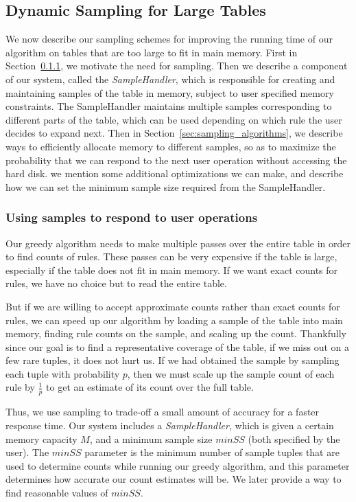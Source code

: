 

\subsection{Dynamic Sampling for Large Tables}\label{sec:sampling}
We now describe our sampling schemes for improving the running time of our algorithm on tables that are too large to fit in main memory. First in Section~\ref{sec:sample-using}, we motivate the need for sampling. Then we describe a component of our system, called the {\em SampleHandler}, which is responsible for creating and maintaining samples of the table in memory, subject to user specified memory constraints. The SampleHandler maintains multiple samples corresponding to different parts of the table, which can be used depending on which rule the user decides to expand next. Then in Section~\ref{sec:sampling_algorithms}, we describe ways to efficiently allocate memory to different samples, so as to maximize the probability that we can respond to the next user operation without accessing the hard disk. 
we mention some additional optimizations we can make, and
describe how we can set the minimum sample size required from the SampleHandler.

\subsubsection{Using samples to respond to user operations}\label{sec:sample-using}
Our greedy algorithm needs to make multiple passes over the entire table in order to find counts of rules. These passes can be very expensive if the table is large, especially if the table does not fit in main memory. If we want exact counts for rules, we have no choice but to read the entire table. 

But if we are willing to accept approximate counts rather than exact counts for rules, we can speed up our algorithm by loading a sample of the table into main memory, finding rule counts on the sample, and scaling up the count. Thankfully since our goal is to find a representative coverage of the table,
if we miss out on a few rare tuples, it does not hurt us. If we had obtained the sample by sampling each tuple with probability $p$, then we must scale up the sample count of each rule by $\frac{1}{p}$ to get an estimate of its count over the full table. 

Thus, we use sampling to trade-off a small amount of accuracy for a faster response time. Our system includes a {\em SampleHandler}, which is given a certain memory capacity $M$, and a minimum sample size $minSS$ (both specified by the user).
The $minSS$ parameter is the minimum number of sample tuples that are used to determine counts while running our greedy algorithm, and this parameter determines how accurate our count estimates will be. We later provide a way to find reasonable values of $minSS$.

